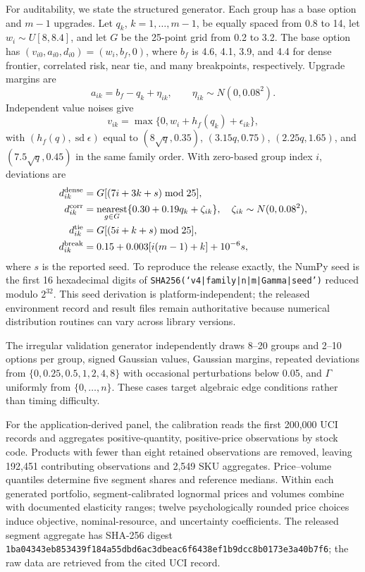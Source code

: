 \documentclass[11pt]{article}
\theoremstyle{plain}
\theoremstyle{definition}
\theoremstyle{remark}
\begin{document}
For auditability, we state the structured generator.  Each group has a base option and $m-1$ upgrades.  Let $q_k$, $k=1,\ldots,m-1$, be equally spaced from 0.8 to 14, let $w_i\sim U[8,8.4]$, and let
$G$ be the 25-point grid from 0.2 to 3.2.  The base option has
$(v_{i0},a_{i0},d_{i0})=(w_i,b_f,0)$, where
$b_f$ is 4.6, 4.1, 3.9, and 4.4 for dense frontier, correlated risk, near tie, and many breakpoints, respectively.  Upgrade margins are
\[
a_{ik}=b_f-q_k+\eta_{ik},\qquad \eta_{ik}\sim N(0,0.08^2).
\]
Independent value noises give
\[
v_{ik}=\max\{0,w_i+h_f(q_k)+\epsilon_{ik}\},
\]
with $(h_f(q),\operatorname{sd}\epsilon)$ equal to
$(8\sqrt q,0.35)$, $(3.15q,0.75)$, $(2.25q,1.65)$, and
$(7.5\sqrt q,0.45)$ in the same family order.  With zero-based group index $i$, deviations are
\begin{align*}
d_{ik}^{\rm dense}&=G[(7i+3k+s)\bmod25],\\
d_{ik}^{\rm corr}&=\operatorname*{nearest}_{g\in G}
\{0.30+0.19q_k+\zeta_{ik}\},\quad \zeta_{ik}\sim N(0,0.08^2),\\
d_{ik}^{\rm tie}&=G[(5i+k+s)\bmod25],\\
d_{ik}^{\rm break}&=0.15+0.003[i(m-1)+k]+10^{-6}s,
\end{align*}
where $s$ is the reported seed.  To reproduce the release exactly, the NumPy seed is the first 16 hexadecimal digits of
\texttt{SHA256(`v4|family|n|m|Gamma|seed')} reduced modulo $2^{32}$.  This seed derivation is platform-independent; the released environment record and result files remain authoritative because numerical distribution routines can vary across library versions.

The irregular validation generator independently draws 8--20 groups and 2--10 options per group, signed Gaussian values, Gaussian margins, repeated deviations from $\{0,0.25,0.5,1,2,4,8\}$ with occasional perturbations below 0.05, and $\Gamma$ uniformly from $\{0,\ldots,n\}$.  These cases target algebraic edge conditions rather than timing difficulty.

For the application-derived panel, the calibration reads the first 200,000 UCI records and aggregates positive-quantity, positive-price observations by stock code.  Products with fewer than eight retained observations are removed, leaving 192,451 contributing observations and 2,549 SKU aggregates.  Price--volume quantiles determine five segment shares and reference medians.  Within each generated portfolio, segment-calibrated lognormal prices and volumes combine with documented elasticity ranges; twelve psychologically rounded price choices induce objective, nominal-resource, and uncertainty coefficients.  The released segment aggregate has SHA-256 digest \nolinkurl{1ba04343eb853439f184a55dbd6ac3dbeac6f6438ef1b9dcc8b0173e3a40b7f6}; the raw data are retrieved from the cited UCI record.
\end{document}
